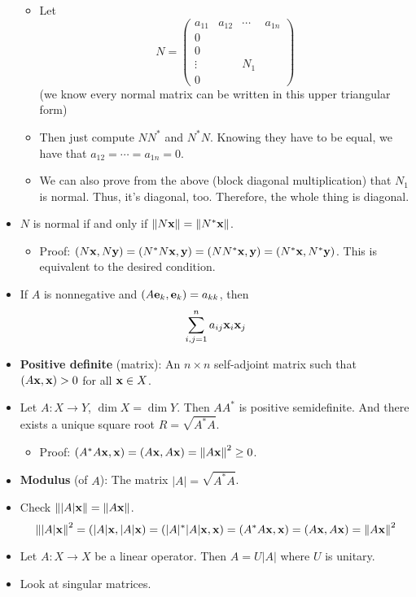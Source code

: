 \documentclass[../../notes.tex]{subfiles}
\begin{document}
\begin{itemize}
\begin{itemize}
        \item Let
        \begin{equation*}
            N =
            \begin{pmatrix}
                a_{11} & a_{12} & \cdots & a_{1n}\\
                0 &  &  & \\
                0 &  &  & \\
                \vdots &  & N_1 & \\
                0 &  &  & \
            \end{pmatrix}
        \end{equation*}
        (we know every normal matrix can be written in this upper triangular form)
        \item Then just compute $NN^*$ and $N^*N$. Knowing they have to be equal, we have that $a_{12}=\cdots=a_{1n}=0$.
        \item We can also prove from the above (block diagonal multiplication) that $N_1$ is normal. Thus, it's diagonal, too. Therefore, the whole thing is diagonal.
    \end{itemize}
    \item $N$ is normal if and only if $\norm{N\mathbf{x}}=\norm{N^*\mathbf{x}}$.
    \begin{itemize}
        \item Proof: $(N\mathbf{x},N\mathbf{y})=(N^*N\mathbf{x},\mathbf{y})=(NN^*\mathbf{x},\mathbf{y})=(N^*\mathbf{x},N^*\mathbf{y})$. This is equivalent to the desired condition.
    \end{itemize}
    \item If $A$ is nonnegative and $(A\mathbf{e}_k,\mathbf{e}_k)=a_{kk}$, then
    \begin{equation*}
        \sum_{i,j=1}^na_{ij}\mathbf{x}_i\mathbf{x}_j
    \end{equation*}
    \item \textbf{Positive definite} (matrix): An $n\times n$ self-adjoint matrix such that $(A\mathbf{x},\mathbf{x})>0$ for all $\mathbf{x}\in X$.
    \item Let $A:X\to Y$, $\dim X=\dim Y$. Then $AA^*$ is positive semidefinite. And there exists a unique square root $R=\sqrt{A^*A}$.
    \begin{itemize}
        \item Proof: $(A^*A\mathbf{x},\mathbf{x})=(A\mathbf{x},A\mathbf{x})=\norm{A\mathbf{x}}^2\geq 0$.
    \end{itemize}
    \item \textbf{Modulus} (of $A$): The matrix $|A|=\sqrt{A^*A}$.
    \item Check $\norm{|A|\mathbf{x}}=\norm{A\mathbf{x}}$.
    \begin{equation*}
        \norm{|A|\mathbf{x}}^2
        = (|A|\mathbf{x},|A|\mathbf{x})
        = (|A|^*|A|\mathbf{x},\mathbf{x})
        = (A^*A\mathbf{x},\mathbf{x})
        = (A\mathbf{x},A\mathbf{x})
        = \norm{A\mathbf{x}}^2
    \end{equation*}
    \item Let $A:X\to X$ be a linear operator. Then $A=U|A|$ where $U$ is unitary.
    \item Look at singular matrices.
\end{itemize}
\end{document}
